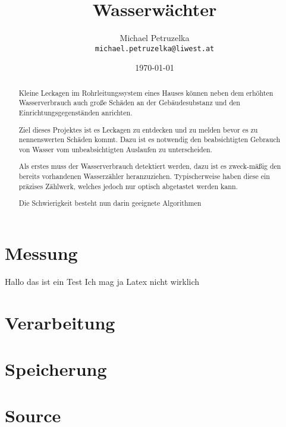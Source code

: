 \documentclass[a4paper,12pt]{report}
\begin{document}
\title{Wasserwächter}
\author{Michael Petruzelka\\
\texttt{michael.petruzelka@liwest.at}}
\date{\today}
\maketitle
\begin{abstract}
Kleine Leckagen im Rohrleitungssystem eines Hauses können neben dem erhöhten Wasserverbrauch auch große Schäden 
an der Gebäudesubstanz und den Einrichtungsgegenständen anrichten. 

Ziel dieses Projektes ist es Leckagen zu entdecken und zu melden bevor es zu nennenswerten Schäden kommt. 
Dazu ist es notwendig den beabsichtigten Gebrauch von Wasser vom unbeabsichtigten Auslaufen zu unterscheiden.

Als erstes muss der Wasserverbrauch detektiert werden, 
dazu ist es zweck-mäßig den bereits vorhandenen Wasserzähler heranzuziehen. 
Typischerweise haben diese ein präzises Zählwerk, welches jedoch nur optisch abgetastet werden kann.

Die Schwierigkeit besteht nun darin geeignete Algorithmen 
\end{abstract}
\tableofcontents
\chapter{Messung}
Hallo das ist ein Test
Ich mag ja Latex nicht wirklich
\chapter{Verarbeitung}
\chapter{Speicherung}
\chapter{Source}
\end{document}
